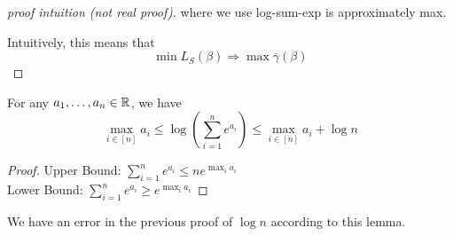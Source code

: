 \begin{proof}[proof intuition (not real proof)]
    where we use log-sum-exp is approximately max. 

    Intuitively, this means that 
    \[
        \min L_S (\beta) \Rightarrow \max \overline{\gamma} (\beta)  
    \]


    
\end{proof}


\begin{lemma}
    For any \(a_1, \ldots, a_n \in \mathbb{R}\), we have 
    \[
        \max_{i\in [n]} a_i \leq \log \left(  \sum_{i=1}^n e^{a_i}  \right)
        \leq \max_{i \in [n]} a_i + \log n   
    \]
\end{lemma}

\begin{proof}
    Upper Bound: \(\sum_{i=1}^n e^{a_i} \leq n e^{\max_i a_i}\) \\ 
    Lower Bound: \(\sum_{i=1}^n e^{a_i} \geq e^{\max_i a_i}\)
\end{proof}

\begin{remark}
    We have an error in the previous proof of \(\log n\) according to this lemma. 
\end{remark}

